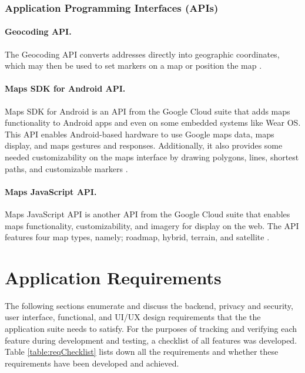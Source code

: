 \subsubsection{Application Programming Interfaces (APIs)}

\paragraph{Geocoding API.} The Geocoding API converts addresses directly into geographic coordinates, which may then be used to set markers on a map or position the map  \cite{geocoding}.

\paragraph{Maps SDK for Android API.} Maps SDK for Android is an API from the Google Cloud suite that adds maps functionality to Android apps and even on some embedded systems like Wear OS. This API enables Android-based hardware to use Google maps data, maps display, and maps gestures and responses. Additionally, it also provides some needed customizability on the maps interface by drawing polygons, lines, shortest paths, and customizable markers \cite{androidSDK}. 

\paragraph{Maps JavaScript API.} Maps JavaScript API is another API from the Google Cloud suite that enables maps functionality, customizability, and imagery for display on the web. The API features four map types, namely; roadmap, hybrid, terrain, and satellite \cite{javascriptSDK}.

\section{Application Requirements}

The following sections enumerate and discuss the backend, privacy and security, user interface, functional, and UI/UX design requirements that the the application suite needs to satisfy. For the purposes of tracking and verifying each feature during development and testing, a checklist of all features was developed. Table \ref{table:reqChecklist} lists down all the requirements and whether these requirements have been developed and achieved. 

